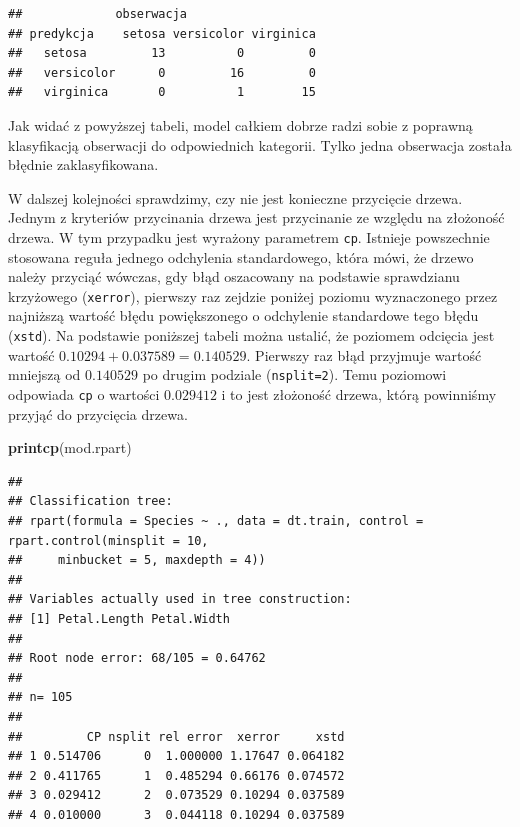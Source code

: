 \documentclass[]{book}
\newenvironment{Shaded}{\begin{snugshade}}{\end{snugshade}}
\newcommand{\DataTypeTok}[1]{\textcolor[rgb]{0.13,0.29,0.53}{#1}}
\newcommand{\KeywordTok}[1]{\textcolor[rgb]{0.13,0.29,0.53}{\textbf{#1}}}
\newcommand{\NormalTok}[1]{#1}
\newcommand{\OperatorTok}[1]{\textcolor[rgb]{0.81,0.36,0.00}{\textbf{#1}}}
\newcommand{\StringTok}[1]{\textcolor[rgb]{0.31,0.60,0.02}{#1}}
\theoremstyle{plain}
\theoremstyle{definition}
\begin{document}
\begin{Shaded}
\end{Shaded}

\begin{verbatim}
##             obserwacja
## predykcja    setosa versicolor virginica
##   setosa         13          0         0
##   versicolor      0         16         0
##   virginica       0          1        15
\end{verbatim}

Jak widać z powyższej tabeli, model całkiem dobrze radzi sobie z poprawną klasyfikacją obserwacji do odpowiednich kategorii. Tylko jedna obserwacja została błędnie zaklasyfikowana.

W dalszej kolejności sprawdzimy, czy nie jest konieczne przycięcie drzewa. Jednym z kryteriów przycinania drzewa jest przycinanie ze względu na złożoność drzewa. W tym przypadku jest wyrażony parametrem \texttt{cp}. Istnieje powszechnie stosowana reguła jednego odchylenia standardowego, która mówi, że drzewo należy przyciąć wówczas, gdy błąd oszacowany na podstawie sprawdzianu krzyżowego (\texttt{xerror}), pierwszy raz zejdzie poniżej poziomu wyznaczonego przez najniższą wartość błędu powiększonego o odchylenie standardowe tego błędu (\texttt{xstd}). Na podstawie poniższej tabeli można ustalić, że poziomem odcięcia jest wartość \(0.10294+0.037589=0.140529\). Pierwszy raz błąd przyjmuje wartość mniejszą od \(0.140529\) po drugim podziale (\texttt{nsplit=2}). Temu poziomowi odpowiada \texttt{cp} o wartości \(0.029412\) i to jest złożoność drzewa, którą powinniśmy przyjąć do przycięcia drzewa.

\begin{Shaded}
\begin{Highlighting}[]
\KeywordTok{printcp}\NormalTok{(mod.rpart)}
\end{Highlighting}
\end{Shaded}

\begin{verbatim}
## 
## Classification tree:
## rpart(formula = Species ~ ., data = dt.train, control = rpart.control(minsplit = 10, 
##     minbucket = 5, maxdepth = 4))
## 
## Variables actually used in tree construction:
## [1] Petal.Length Petal.Width 
## 
## Root node error: 68/105 = 0.64762
## 
## n= 105 
## 
##         CP nsplit rel error  xerror     xstd
## 1 0.514706      0  1.000000 1.17647 0.064182
## 2 0.411765      1  0.485294 0.66176 0.074572
## 3 0.029412      2  0.073529 0.10294 0.037589
## 4 0.010000      3  0.044118 0.10294 0.037589
\end{verbatim}
\end{document}
